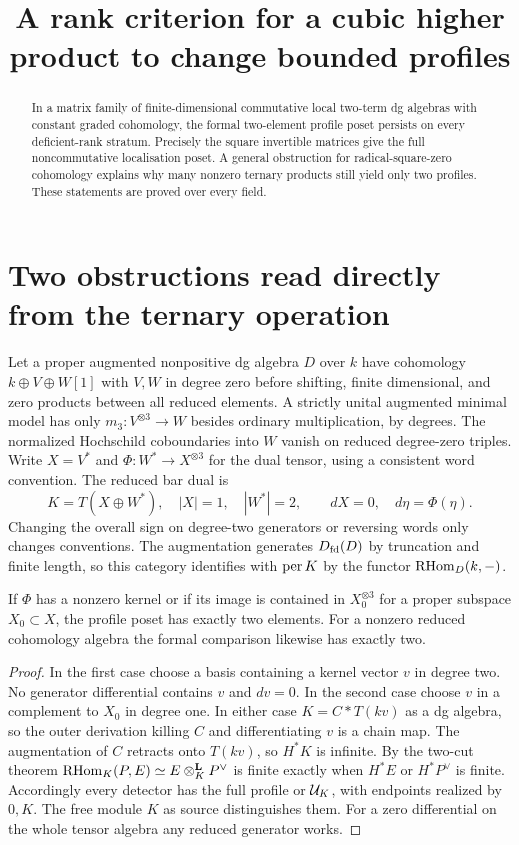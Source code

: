 \documentclass[11pt]{article}
\title{A rank criterion for a cubic higher product to change bounded profiles}
\author{\workingauthor}\date{\coursedate}
\begin{document}
\maketitle
\begin{abstract}
In a matrix family of finite-dimensional commutative local two-term dg
algebras with constant graded cohomology, the formal two-element profile
poset persists on every deficient-rank stratum. Precisely the square
invertible matrices give the full noncommutative localisation poset.
A general obstruction for radical-square-zero cohomology explains why
many nonzero ternary products still yield only two profiles. These
statements are proved over every field.
\end{abstract}

\section{Two obstructions read directly from the ternary operation}
Let a proper augmented nonpositive dg algebra $D$ over $k$ have
cohomology $k\oplus V\oplus W[1]$ with $V,W$ in degree zero before
shifting, finite dimensional, and zero products between all reduced
elements. A strictly unital augmented minimal model has only
$m_3:V^{\otimes3}\to W$ besides ordinary multiplication, by degrees.
The normalized Hochschild coboundaries into $W$ vanish on reduced
degree-zero triples. Write $X=V^*$ and
$\Phi:W^*\to X^{\otimes3}$ for the dual tensor, using a consistent
word convention. The reduced bar dual is
\[
 K=T(X\oplus W^*),\quad |X|=1,\quad |W^*|=2,\qquad
 dX=0,\quad d\eta=\Phi(\eta).
\]
Changing the overall sign on degree-two generators or reversing words
only changes conventions. The augmentation generates $D_{\mathrm{fd}}(D)$ by
truncation and finite length, so this category identifies with
$\operatorname{per} K$ by the functor $\operatorname{RHom}_D(k,-)$.

\begin{prop}\label{obstruction}
If $\Phi$ has a nonzero kernel or if its image is contained in
$X_0^{\otimes3}$ for a proper subspace $X_0\subset X$, the profile
poset has exactly two elements. For a nonzero reduced cohomology
algebra the formal comparison likewise has exactly two.
\end{prop}
\begin{proof}
In the first case choose a basis containing a kernel vector $v$ in
degree two. No generator differential contains $v$ and $dv=0$. In
the second case choose $v$ in a complement to $X_0$ in degree one.
In either case $K=C*T(kv)$ as a dg algebra, so the outer derivation
killing $C$ and differentiating $v$ is a chain map. The augmentation
of $C$ retracts onto $T(kv)$, so $H^*K$ is infinite. By the two-cut
theorem $\operatorname{RHom}_K(P,E)\simeq E\otimes^{\mathbf L}_KP^\vee$ is finite exactly when
$H^*E$ or $H^*P^\vee$ is finite. Accordingly every detector has the full
profile or $\mathcal U_K$, with endpoints realized by $0,K$. The free module
$K$ as source distinguishes them. For a zero differential on the whole
tensor algebra any reduced generator works.
\end{proof}
\end{document}

